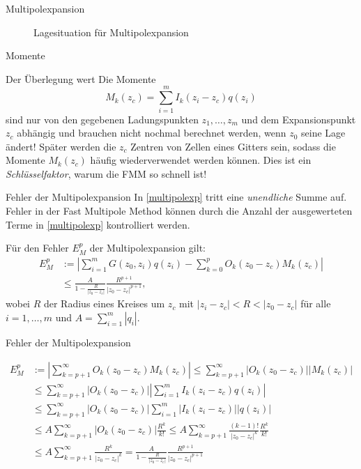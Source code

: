 \documentclass[ngerman]{beamer}
\begin{document}
\begin{frame}{Multipolexpansion}
\begin{figure}
\def\svgwidth{0.5\textwidth}

\caption{Lagesituation für Multipolexpansion}
\end{figure}
\end{frame}

\begin{frame}{Momente}
\begin{block}{Der Überlegung wert}
Die Momente \[ M_k(z_c) =  \sum_{i=1}^m I_k(z_i-z_c) q(z_i) \] sind nur von den gegebenen Ladungspunkten $z_1,\ldots,z_m$ und dem Expansionspunkt $z_c$ abhängig und brauchen nicht nochmal berechnet werden, wenn $z_0$ seine Lage ändert!
Später werden die $z_c$ Zentren von Zellen eines Gitters sein, sodass die Momente $M_k(z_c)$ häufig wiederverwendet werden können. Dies ist ein \emph{Schlüsselfaktor}, warum die FMM so schnell ist!
\end{block}

\end{frame}
\begin{frame}{Fehler der Multipolexpansion}
In \eqref{multipolexp} tritt eine \emph{unendliche} Summe auf. Fehler in der Fast Multipole Method können durch die Anzahl der ausgewerteten Terme in \eqref{multipolexp} kontrolliert werden.
\begin{Satz}
Für den Fehler $E_M^p$ der Multipolexpansion gilt:
\begin{align*}
E^p_M&:= \left|\sum_{i=1}^m {G(z_0,z_i)q(z_i)} - \sum_{k=0}^p O_k(z_0-z_c)M_k(z_c)\right| \\
&\leq \frac{A}{1-\frac{R}{|z_0-z_c|}}\frac{R^{p+1}}{|z_0-z_c|^{p+1}}, 
\end{align*}
wobei $R$ der Radius eines Kreises um $z_c$ mit $|z_i-z_c| < R < |z_0-z_c|$ für alle $i=1,\ldots,m$ und $A=\sum_{i=1}^m |q_i|$.
\end{Satz}
\end{frame}

\begin{frame}{Fehler der Multipolexpansion}
\footnotesize
\begin{Beweis}
\begin{align*}
E^p_M&:= \left|\sum_{k=p+1}^\infty O_k(z_0-z_c)M_k(z_c)\right| \leq \sum_{k=p+1}^\infty |O_k(z_0-z_c)||M_k(z_c)| \\
&\leq \sum_{k=p+1}^\infty |O_k(z_0-z_c)| \left|\sum_{i=1}^m I_k(z_i-z_c) q(z_i)\right| \\
&\leq \sum_{k=p+1}^\infty |O_k(z_0-z_c)| \sum_{i=1}^m |I_k(z_i-z_c)| |q(z_i)| \\
&\leq A \sum_{k=p+1}^\infty |O_k(z_0-z_c)| \frac{R^k}{k!} \leq A \sum_{k=p+1}^\infty \frac{(k-1)!}{|z_0-z_c|^k} \frac{R^k}{k!} \\
&\leq A \sum_{k=p+1}^\infty \frac{R^k}{|z_0-z_c|^k} = \frac{A}{1-\frac{R}{|z_0-z_c|}}\frac{R^{p+1}}{|z_0-z_c|^{p+1}}
\end{align*}
\end{Beweis}
\end{frame}
\end{document}
